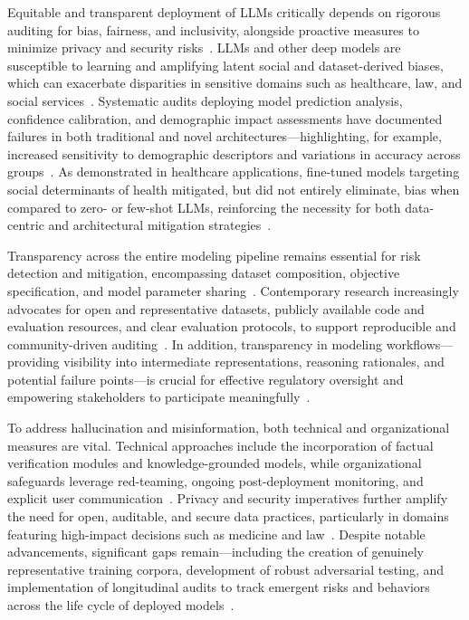 \documentclass[sigconf]{acmart}
\begin{document}
Equitable and transparent deployment of LLMs critically depends on rigorous auditing for bias, fairness, and inclusivity, alongside proactive measures to minimize privacy and security risks~\cite{ref1, ref2, ref3, ref10, ref14, ref21, ref22, ref23, ref36, ref42, ref43, ref44, ref46, ref49, ref52, ref53, ref65, ref73}. LLMs and other deep models are susceptible to learning and amplifying latent social and dataset-derived biases, which can exacerbate disparities in sensitive domains such as healthcare, law, and social services~\cite{ref3, ref10, ref21, ref22, ref23, ref42, ref43, ref44, ref49, ref52, ref53, ref65}. Systematic audits deploying model prediction analysis, confidence calibration, and demographic impact assessments have documented failures in both traditional and novel architectures---highlighting, for example, increased sensitivity to demographic descriptors and variations in accuracy across groups~\cite{ref22, ref44, ref49, ref53}. As demonstrated in healthcare applications, fine-tuned models targeting social determinants of health mitigated, but did not entirely eliminate, bias when compared to zero- or few-shot LLMs, reinforcing the necessity for both data-centric and architectural mitigation strategies~\cite{ref2, ref22, ref23}.

Transparency across the entire modeling pipeline remains essential for risk detection and mitigation, encompassing dataset composition, objective specification, and model parameter sharing~\cite{ref14, ref36, ref46, ref65, ref73}. Contemporary research increasingly advocates for open and representative datasets, publicly available code and evaluation resources, and clear evaluation protocols, to support reproducible and community-driven auditing~\cite{ref1, ref36, ref44, ref49, ref65, ref73}. In addition, transparency in modeling workflows---providing visibility into intermediate representations, reasoning rationales, and potential failure points---is crucial for effective regulatory oversight and empowering stakeholders to participate meaningfully~\cite{ref14, ref45, ref46, ref49, ref52, ref65}.

To address hallucination and misinformation, both technical and organizational measures are vital. Technical approaches include the incorporation of factual verification modules and knowledge-grounded models, while organizational safeguards leverage red-teaming, ongoing post-deployment monitoring, and explicit user communication~\cite{ref3, ref10, ref21, ref42, ref43, ref65}. Privacy and security imperatives further amplify the need for open, auditable, and secure data practices, particularly in domains featuring high-impact decisions such as medicine and law~\cite{ref14, ref36, ref42, ref46, ref53, ref65}. Despite notable advancements, significant gaps remain---including the creation of genuinely representative training corpora, development of robust adversarial testing, and implementation of longitudinal audits to track emergent risks and behaviors across the life cycle of deployed models~\cite{ref21, ref22, ref23, ref42, ref65, ref73}.
\end{document}
